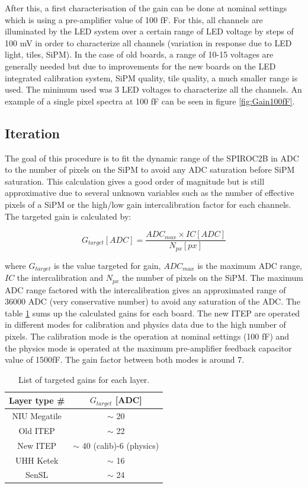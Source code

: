 After this, a first characterisation of the gain can be done at nominal settings which is using a pre-amplifier value of 100 fF. For this, all channels are illuminated by the LED system over a certain range of LED voltage by steps of 100 mV in order to characterize all channels (variation in response due to LED light, tiles, SiPM). In the case of old boards, a range of 10-15 voltages are generally needed but due to improvements for the new boards on the LED integrated calibration system, SiPM quality, tile quality, a much smaller range is used. The minimum used was 3 LED voltages to characterize all the channels. An example of a single pixel spectra at 100 fF can be seen in figure \ref{fig:Gain100fF}.

\subsection{Iteration}

The goal of this procedure is to fit the dynamic range of the SPIROC2B in ADC to the number of pixels on the SiPM to avoid any ADC saturation before SiPM saturation. This calculation gives a good order of magnitude but is still approximative due to several unknown variables such as the number of effective pixels of a SiPM or the high/low gain intercalibration factor for each channels. The targeted gain is calculated by:

\begin{equation}
  G_{target} [ADC] = \frac{ADC_{max} \times IC [ADC]}{N_{px} [px]}
\end{equation}

where $G_{target}$ is the value targeted for gain, $ADC_{max}$ is the maximum ADC range, $IC$ the intercalibration and $N_{px}$ the number of pixels on the SiPM. The maximum ADC range factored with the intercalibration gives an approximated range of 36000 ADC (very conservative number) to avoid any saturation of the ADC. The table \ref{table:GainTarget_SiPM} sums up the calculated gains for each board. The new ITEP are operated in different modes for calibration and physics data due to the high number of pixels. The calibration mode is the operation at nominal settings (100 fF) and the physics mode is operated at the maximum pre-amplifier feedback capacitor value of 1500fF. The gain factor between both modes is around 7.

\begin{table}[htb!]
  \centering
  \caption{List of targeted gains for each layer.}
  \label{table:GainTarget_SiPM}
  \begin{tabular}{@{} cc @{}}
    \hline
    Layer type \# & $G_{target}$ [ADC] \\
    \hline
    NIU Megatile & $\sim$ 20\\
    Old ITEP & $\sim$ 22\\
    New ITEP & $\sim$ 40 (calib)-6 (physics)\\
    UHH Ketek & $\sim$ 16\\
    SenSL & $\sim$ 24\\
    \hline
  \end{tabular}
\end{table}

